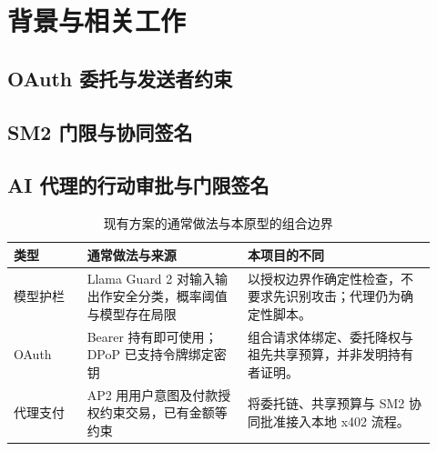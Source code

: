 \documentclass[UTF8,zihao=-4,a4paper]{ctexart}
\newif\ifshowguide
\newcommand{\guide}[1]{%
  \ifshowguide
  \begin{tcolorbox}[colback=gray!8,colframe=gray!45,boxrule=0.4pt,
      arc=1pt,left=4pt,right=4pt,top=2pt,bottom=2pt,fontupper=\small]
  \textbf{写作指引：}#1
  \end{tcolorbox}
  \fi}
\theoremstyle{plain}
\theoremstyle{definition}
\theoremstyle{remark}
\begin{document}
\guide{贡献只写这三条，每条结尾都指向对应章节。已有的 OAuth/请求证明/预算/恢复能力在\cref{sec:base}作为“基础”介绍，不列为贡献。撤销名单快照只能放在贡献列表之外，明确写“尚未实现”。}

\section{背景与相关工作}\label{sec:related}

\guide{每个小节先说别人解决了什么，再说和本文的区别。对别人的方案不确定的地方写“未确认”，不能因为没看到就写成“不支持”。}

\subsection{OAuth 委托与发送者约束}
\guide{RFC 8693 令牌交换、RFC 9449 DPoP、RFC 9700 安全最佳实践。持有者证明是已有标准方向；本项目的 请求证明 是参照 DPoP 思路的国密私有 profile，不与标准 DPoP 互通。}

\subsection{SM2 门限与协同签名}
\guide{SM2 签名 $s=(1+d)^{-1}(k+r)-r$ 中含有 $(1+d)^{-1}$，不能像 Schnorr 那样把份额线性相加，这是 SM2 门限化的难点。按以下脉络写：两方协同签名\cite{shang2014}；无可信中心的门限方案\cite{tiis2016}；基于同态加密与零知识证明、可识别中止的方案\cite{liang2024,faster2025}。明确写出：两方 SM2 协同签名本身是已有技术，并已在移动端等场景广泛使用；本文采用其中最简洁的两方乘法分享结构，贡献\textbf{不在}签名算法本身，而在于份额释放条件与 OAuth 授权状态的绑定，以及与受理事务、效果端、支付的组合。}

\subsection{AI 代理的行动审批与门限签名}
\guide{重点写 KITA\cite{kita}。KITA：提议者不持有份额，多个 LLM 评审者审查同一规范化授权对象，审查通过后签名服务释放份额，最终形成门限 BLS 签名，采用 DKG。有外部评审指出其安全论证中审批通道没有被建模（引用时注明这是外部观察）。与本文的区别用下表说明。}

\begin{table}[htbp]
\centering\small
\caption{现有方案的通常做法与本原型的组合边界}\label{tab:compare}
\begin{tabular}{@{}p{0.16\linewidth}p{0.35\linewidth}p{0.41\linewidth}@{}}
\toprule
类型 & 通常做法与来源 & 本项目的不同 \\
\midrule
模型护栏 & Llama Guard 2 对输入输出作安全分类，概率阈值与模型存在局限\cite{llamaguard2} & 以授权边界作确定性检查，不要求先识别攻击；代理仍为确定性脚本。 \\
OAuth & Bearer 持有即可使用\cite{rfc6750}；DPoP 已支持令牌绑定密钥\cite{rfc9449} & 组合请求体绑定、委托降权与祖先共享预算，并非发明持有者证明。 \\
代理支付 & AP2 用用户意图及付款授权约束交易，已有金额等约束\cite{ap2} & 将委托链、共享预算与 SM2 协同批准接入本地 x402 流程。 \\
\bottomrule
\end{tabular}
\end{table}
\end{document}
